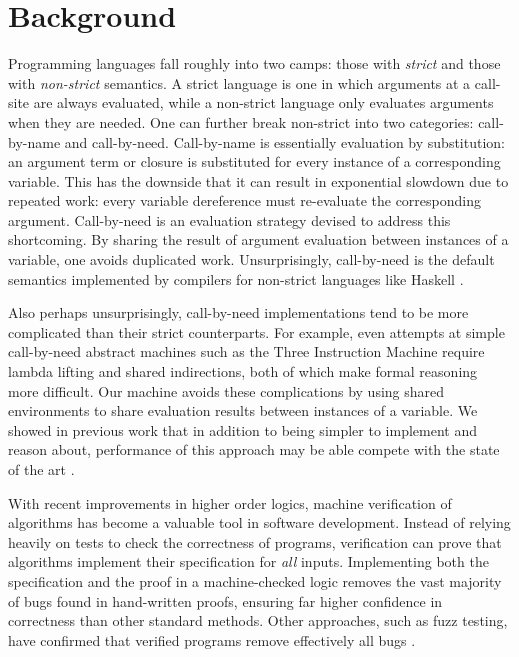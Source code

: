 \section{Background} \label{sec:background}

Programming languages fall roughly into two camps: those with
\emph{strict} and those with \emph{non-strict} semantics. A strict language is
one in which arguments at a call-site are always evaluated, while a non-strict
language only evaluates arguments when they are needed. One can further break
non-strict into two categories: call-by-name and call-by-need. Call-by-name is
essentially evaluation by substitution: an argument term or closure is
substituted for every instance of a corresponding variable. This has the
downside that it can result in exponential slowdown due to repeated work: every
variable dereference must re-evaluate the corresponding argument. Call-by-need
is an evaluation strategy devised to address this shortcoming. By sharing the
result of argument evaluation between instances of a variable, one avoids
duplicated work.  Unsurprisingly, call-by-need is the default semantics
implemented by compilers for non-strict languages like Haskell \cite{jonesstg}. 

Also perhaps unsurprisingly, call-by-need implementations tend to be more
complicated than their strict counterparts. For example, even attempts at simple
call-by-need abstract machines such as the Three Instruction Machine \cite{TIM}
require lambda lifting and shared indirections, both of which make formal
reasoning more difficult. Our \ce machine avoids these complications
by using shared environments to share evaluation results between instances of a
variable. We showed in previous work that in addition to being simpler to
implement and reason about, performance of this approach may be able compete
with the state of the art \cite{cem}. 

With recent improvements in higher order logics, machine verification of
algorithms has become a valuable tool in software development. Instead of
relying heavily on tests to check the correctness of programs, verification can
prove that algorithms implement their specification for \emph{all} inputs.
Implementing both the specification and the proof in a machine-checked logic
removes the vast majority of bugs found in hand-written proofs, ensuring far
higher confidence in correctness than other standard methods. Other approaches,
such as fuzz testing, have confirmed that verified programs remove effectively
all bugs \cite{yangfuzz}.

